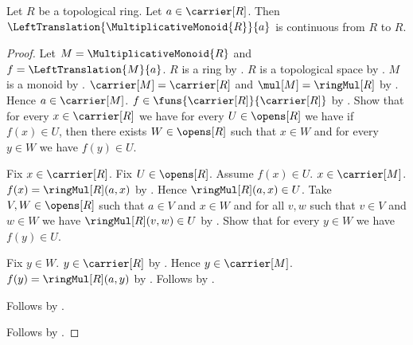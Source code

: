 \begin{theorem}\label{topological_ring_left_multiplication_continuous}
    Let $R$ be a topological ring.
    Let $a\in\carrier[R]$.
    Then $\LeftTranslation{\MultiplicativeMonoid{R}}{a}$ is continuous
        from $R$ to $R$.
\end{theorem}
\begin{proof}
    Let $M=\MultiplicativeMonoid{R}$ and
        $f=\LeftTranslation{M}{a}$.
    $R$ is a ring by .
    $R$ is a topological space by
        .
    $M$ is a monoid by .
    $\carrier[M]=\carrier[R]$ and $\mul[M]=\ringMul[R]$
        by .
    Hence $a\in\carrier[M]$.
    $f\in\funs{\carrier[R]}{\carrier[R]}$ by
        .
    Show that for every $x\in\carrier[R]$ we have
        for every $U\in\opens[R]$ we have if $f(x)\in U$, then there exists
            $W\in\opens[R]$ such that $x\in W$ and
            for every $y\in W$ we have $f(y)\in U$.
    \begin{subproof}
        Fix $x\in\carrier[R]$.
        Fix $U\in\opens[R]$.
        Assume $f(x)\in U$.
        $x\in\carrier[M]$.
        $f(x)=\ringMul[R](a,x)$ by
            .
        Hence $\ringMul[R](a,x)\in U$.
        Take $V,W\in\opens[R]$ such that $a\in V$ and $x\in W$ and
            for all $v,w$ such that $v\in V$ and $w\in W$ we have
                $\ringMul[R](v,w)\in U$
            by .
        Show that for every $y\in W$ we have $f(y)\in U$.
        \begin{subproof}
            Fix $y\in W$.
            $y\in\carrier[R]$ by
                .
            Hence $y\in\carrier[M]$.
            $f(y)=\ringMul[R](a,y)$ by
                .
            Follows by \auto.
        \end{subproof}
        Follows by \auto.
    \end{subproof}
    Follows by .
\end{proof}

